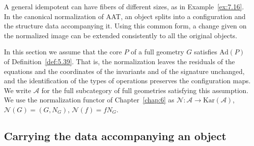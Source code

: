A general idempotent can have fibers of different sizes, as in Example~\ref{ex:7.16}.
In the canonical normalization of AAT, an object splits into a configuration and the
structure data accompanying it.
Using this common form, a change given on the normalized image can be extended consistently
to all the original objects.

In this section we assume that the core $P$ of a full geometry $G$ satisfies
$\mathrm{Ad}(P)$ of Definition~\ref{def:5.39}.
That is, the normalization leaves the residuals of the equations and the coordinates of the
invariants and of the signature unchanged, and the identification of the types of operations
preserves the configuration maps.
We write $\mathcal A$ for the full subcategory of full geometries satisfying this assumption.
We use the normalization functor of Chapter~\ref{chap:6} as
$\mathcal N:\mathcal A\to\mathrm{Kar}(\mathcal A)$,
$\mathcal N(G)=(G,N_G)$, $\mathcal N(f)=fN_G$.

\subsection*{Carrying the data accompanying an object}

